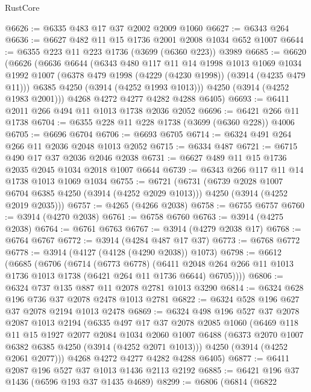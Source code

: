 \begin{lexlean}{RustCore}
\begin{coremodule}
@6626 := @6335 @483 @17 @37 @2002 @2009 @1060
@6627 := @6343 @264
@6636 := @6627 @482 @11 @15 @1736 @2001 @2008 @1034 @652 @1007
@6644 := @6355 @223 @11 @223 @1736 (@3699 (@6360 @223)) @3989
@6685 := @6620
    (@6626
      (@6636
        @6644
        (@6343
          @480
          @117
          @11
          @14
          @1998
          @1013
          @1069
          @1034
          @1992
          @1007
          (@6378 @479 @1998 (@4229 (@4230 @1998)) (@3914 (@4235 @479 @11)))
          @6385
          @4250
          (@3914 (@4252 @1993 @1013)))
        @4250
        (@3914 (@4252 @1983 @2001)))
      @4268
      @4272
      @4277
      @4282
      @4288
      @6405)
@6693 := @6411 @2011 @266 @494 @11 @1013 @1738 @2036 @2052
@6696 := @6421 @266 @11 @1738
@6704 := @6355 @228 @11 @228 @1738 (@3699 (@6360 @228)) @4006
@6705 := @6696 @6704
@6706 := @6693 @6705
@6714 := @6324 @491 @264 @266 @11 @2036 @2048 @1013 @2052
@6715 := @6334 @487
@6721 := @6715 @490 @17 @37 @2036 @2046 @2038
@6731 := @6627 @489 @11 @15 @1736 @2035 @2045 @1034 @2018 @1007 @6644
@6739 := @6343 @266 @117 @11 @14 @1738 @1013 @1069 @1034
@6755 := @6721
    (@6731
      (@6739 @2028 @1007 @6704 @6385 @4250 (@3914 (@4252 @2029 @1013)))
      @4250
      (@3914 (@4252 @2019 @2035)))
@6757 := @4265 (@4266 @2038)
@6758 := @6755 @6757
@6760 := @3914 (@4270 @2038)
@6761 := @6758 @6760
@6763 := @3914 (@4275 @2038)
@6764 := @6761 @6763
@6767 := @3914 (@4279 @2038 @17)
@6768 := @6764 @6767
@6772 := @3914 (@4284 @487 @17 @37)
@6773 := @6768 @6772
@6778 := @3914 (@4127 (@4128 (@4290 @2038)) @1073)
@6798 := @6612
    (@6685
      (@6706
        (@6714
          (@6773 @6778)
          (@6411 @2048 @264 @266 @11 @1013 @1736 @1013 @1738 (@6421 @264 @11 @1736 @6644) @6705))))
@6806 := @6324 @737 @135 @887 @11 @2078 @2781 @1013 @3290
@6814 := @6324 @628 @196 @736 @37 @2078 @2478 @1013 @2781
@6822 := @6324 @528 @196 @627 @37 @2078 @2194 @1013 @2478
@6869 := @6324
    @498
    @196
    @527
    @37
    @2078
    @2087
    @1013
    @2194
    (@6335
      @497
      @17
      @37
      @2078
      @2085
      @1060
      (@6469
        @118
        @11
        @15
        @1927
        @2077
        @2084
        @1034
        @2060
        @1007
        @6488
        (@6373 @2070 @1007 @6382 @6385 @4250 (@3914 (@4252 @2071 @1013)))
        @4250
        (@3914 (@4252 @2061 @2077)))
      @4268
      @4272
      @4277
      @4282
      @4288
      @6405)
@6877 := @6411 @2087 @196 @527 @37 @1013 @1436 @2113 @2192
@6885 := @6421 @196 @37 @1436 (@6596 @193 @37 @1435 @4689)
@8299 := @6806
    (@6814
      (@6822

\end{coremodule}
\end{lexlean}
